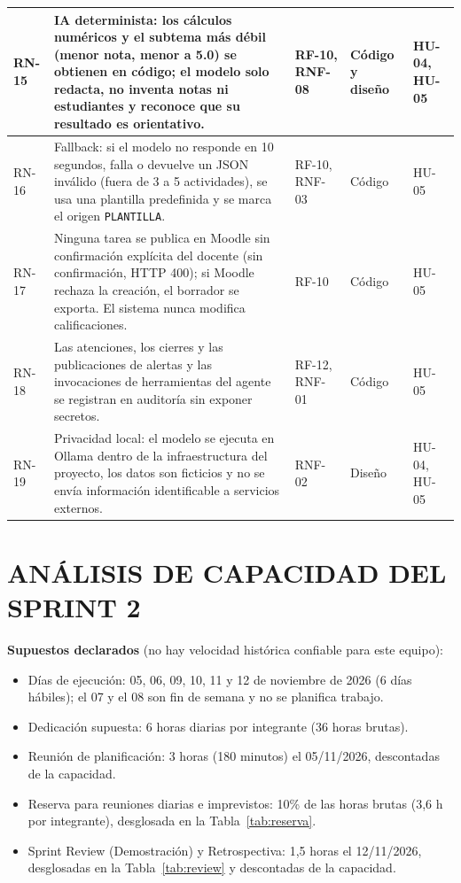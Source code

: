 \documentclass[11pt,a4paper]{article}
\begin{document}
\begin{longtable}{|R{1.3cm}|R{7.4cm}|R{1.9cm}|R{1.7cm}|R{1.7cm}|}
RN-15 & IA determinista: los cálculos numéricos y el subtema más débil (menor nota, menor a 5.0) se obtienen en código; el modelo solo redacta, no inventa notas ni estudiantes y reconoce que su resultado es orientativo. & RF-10, RNF-08 & Código y diseño & HU-04, HU-05\\ \hline
RN-16 & Fallback: si el modelo no responde en 10 segundos, falla o devuelve un JSON inválido (fuera de 3 a 5 actividades), se usa una plantilla predefinida y se marca el origen \texttt{PLANTILLA}. & RF-10, RNF-03 & Código & HU-05\\ \hline
RN-17 & Ninguna tarea se publica en Moodle sin confirmación explícita del docente (sin confirmación, HTTP 400); si Moodle rechaza la creación, el borrador se exporta. El sistema nunca modifica calificaciones. & RF-10 & Código & HU-05\\ \hline
RN-18 & Las atenciones, los cierres y las publicaciones de alertas y las invocaciones de herramientas del agente se registran en auditoría sin exponer secretos. & RF-12, RNF-01 & Código & HU-05\\ \hline
RN-19 & Privacidad local: el modelo se ejecuta en Ollama dentro de la infraestructura del proyecto, los datos son ficticios y no se envía información identificable a servicios externos. & RNF-02 & Diseño & HU-04, HU-05\\ \hline
\end{longtable}

\section{ANÁLISIS DE CAPACIDAD DEL SPRINT 2}

\textbf{Supuestos declarados} (no hay velocidad histórica confiable para este equipo):
\begin{itemize}
  \item Días de ejecución: 05, 06, 09, 10, 11 y 12 de noviembre de 2026 (6 días hábiles); el 07 y el 08 son fin de semana y no se planifica trabajo.
  \item Dedicación supuesta: 6 horas diarias por integrante (36 horas brutas).
  \item Reunión de planificación: 3 horas (180 minutos) el 05/11/2026, descontadas de la capacidad.
  \item Reserva para reuniones diarias e imprevistos: 10\% de las horas brutas (3,6 h por integrante), desglosada en la Tabla~\ref{tab:reserva}.
  \item Sprint Review (Demostración) y Retrospectiva: 1,5 horas el 12/11/2026, desglosadas en la Tabla~\ref{tab:review} y descontadas de la capacidad.
\end{itemize}
\end{document}
